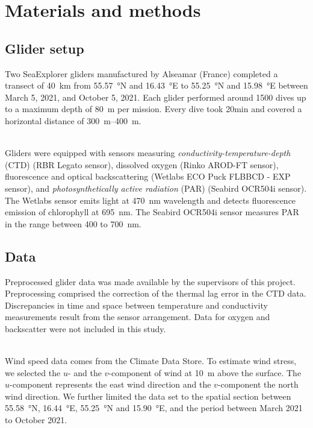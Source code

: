 \documentclass[../Main.tex]{subfiles}
\begin{document}
\section*{\crule[blue]{.3cm}{.3cm} Materials and methods}
\subsection*{\crule[blue]{.2cm}{.2cm} Glider setup}
Two SeaExplorer gliders manufactured by Alseamar (France) completed a transect of \SI{40}{km} from \SI{55.57}{\degree}N and \SI{16.43}{\degree}E to \SI{55.25}{\degree}N and \SI{15.98}{\degree}E between March 5, 2021, and October 5, 2021. 
Each glider performed around 1500 dives up to a maximum depth of \SI{80}{m} per mission. 
Every dive took 20min and covered a horizontal distance of \SIrange{300}{400}{m}. 

\\ 
Gliders were equipped with sensors measuring \emph{conductivity-temperature-depth} (CTD) (RBR Legato sensor), dissolved oxygen (Rinko AROD-FT sensor), fluorescence and optical backscattering (Wetlabs ECO Puck FLBBCD - EXP sensor), and \emph{photosynthetically active radiation} (PAR) (Seabird OCR504i sensor). 
The Wetlabs sensor emits light at \SI{470}{nm} wavelength and detects fluorescence emission of chlorophyll at \SI{695}{nm}. 
The Seabird OCR504i sensor measures PAR in the range between 400 to \SI{700}{nm}\supercite{ACSA2014}.

\subsection*{\crule[blue]{.2cm}{.2cm} Data}
Preprocessed glider data was made available by the supervisors of this project. Preprocessing comprised the correction of the thermal lag error in the CTD data.
Discrepancies in time and space between temperature and conductivity measurements result from the sensor arrangement\supercite{Garau2011}.
Data for oxygen and backscatter were not included in this study.

\\
Wind speed data comes from the Climate Data Store\supercite{era}. 
To estimate wind stress, we selected the $u$- and the $v$-component of wind at \SI{10}{m} above the surface. 
The $u$-component represents the east wind direction and the $v$-component the north wind direction\supercite{era2}. 
We further limited the data set to the spatial section between \SI{55.58}{\degree}N, \SI{16.44}{\degree}E, \SI{55.25}{\degree}N and \SI{15.90}{\degree}E, and the period between March 2021 to October 2021. 
\end{document}
